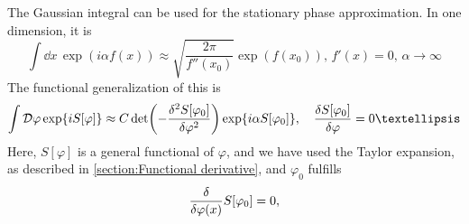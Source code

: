 The Gaussian integral can be used for the stationary phase approximation.
In one dimension, it is
\begin{equation}
    \int \dd x \, \exp(i \alpha f(x)) 
    \approx \sqrt{\frac{2 \pi }{f''(x_0)}}\exp( f(x_0)), 
    \, f'(x) = 0, \, \alpha\rightarrow \infty
\end{equation}
The functional generalization of this is
\begin{equation}
    \int \D \varphi \exp{i S[\varphi]}
    \approx 
    C \det(- \frac{\delta^2 S[\varphi_0]}{\delta \varphi^2})
    \exp{i \alpha S[\varphi_0]  }, \quad
    \frac{\delta S[\varphi_0]}{\delta \varphi} = 0…
\end{equation}
Here, $S[\varphi]$ is a general functional of $\varphi$, and we have used the Taylor expansion, as described in \autoref{section:Functional derivative}, and $\varphi_0$ fulfills
\begin{equation}
    \frac{\delta }{\delta \varphi(x)}{S[\varphi_0]} = 0,
\end{equation}

